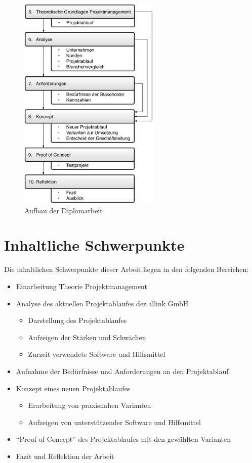 \begin{figure}[htbp]
\begin{center}
\includegraphics[width=0.6\textwidth,angle=0]{./bilder/einleitung/01_gliederung_arbeit.pdf}
\caption[Aufbau der Diplomarbeit]{Aufbau der Diplomarbeit\footnotemark}
\label{pic:01_gliederung_arbeit}
\end{center}
\end{figure}

\section{Inhaltliche Schwerpunkte}
Die inhaltlichen Schwerpunkte dieser Arbeit liegen in den folgenden Bereichen:

\begin{itemize}
    \item Einarbeitung Theorie Projektmanagement
    \item Analyse des aktuellen Projektablaufes der allink GmbH
    \begin{itemize}
        \item Darstellung des Projektablaufes
        \item Aufzeigen der Stärken und Schwächen
        \item Zurzeit verwendete Software und Hilfsmittel
    \end{itemize}
    \item Aufnahme der Bedürfnisse und Anforderungen an den Projektablauf
    \item Konzept eines neuen Projektablaufes
    \begin{itemize}
        \item Erarbeitung von praxisnahen Varianten
        \item Aufzeigen von unterstützender Software und Hilfsmittel
    \end{itemize}
    \item ``Proof of Concept'' des Projektablaufes mit den gewählten Varianten
    \item Fazit und Reflektion der Arbeit
\end{itemize}


